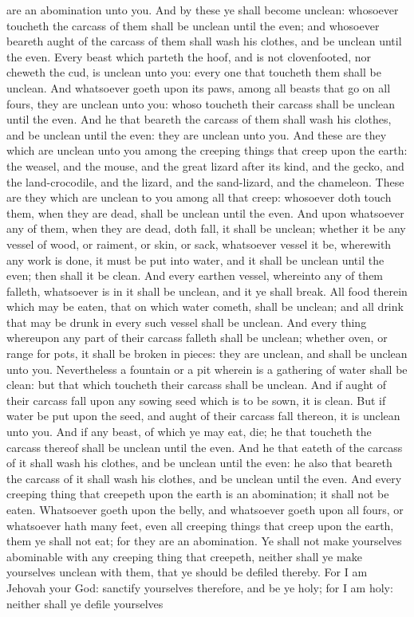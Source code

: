 are an abomination unto you.  And by these ye shall become unclean: whosoever toucheth the carcass of them shall be unclean until the even; and whosoever beareth aught of the carcass of them shall wash his clothes, and be unclean until the even. Every beast which parteth the hoof, and is not clovenfooted, nor cheweth the cud, is unclean unto you: every one that toucheth them shall be unclean. And whatsoever goeth upon its paws, among all beasts that go on all fours, they are unclean unto you: whoso toucheth their carcass shall be unclean until the even. And he that beareth the carcass of them shall wash his clothes, and be unclean until the even: they are unclean unto you.  And these are they which are unclean unto you among the creeping things that creep upon the earth: the weasel, and the mouse, and the great lizard after its kind, and the gecko, and the land-crocodile, and the lizard, and the sand-lizard, and the chameleon. These are they which are unclean to you among all that creep: whosoever doth touch them, when they are dead, shall be unclean until the even. And upon whatsoever any of them, when they are dead, doth fall, it shall be unclean; whether it be any vessel of wood, or raiment, or skin, or sack, whatsoever vessel it be, wherewith any work is done, it must be put into water, and it shall be unclean until the even; then shall it be clean. And every earthen vessel, whereinto any of them falleth, whatsoever is in it shall be unclean, and it ye shall break. All food therein which may be eaten, that on which water cometh, shall be unclean; and all drink that may be drunk in every such vessel shall be unclean. And every thing whereupon any part of their carcass falleth shall be unclean; whether oven, or range for pots, it shall be broken in pieces: they are unclean, and shall be unclean unto you. Nevertheless a fountain or a pit wherein is a gathering of water shall be clean: but that which toucheth their carcass shall be unclean. And if aught of their carcass fall upon any sowing seed which is to be sown, it is clean. But if water be put upon the seed, and aught of their carcass fall thereon, it is unclean unto you.  And if any beast, of which ye may eat, die; he that toucheth the carcass thereof shall be unclean until the even. And he that eateth of the carcass of it shall wash his clothes, and be unclean until the even: he also that beareth the carcass of it shall wash his clothes, and be unclean until the even.  And every creeping thing that creepeth upon the earth is an abomination; it shall not be eaten. Whatsoever goeth upon the belly, and whatsoever goeth upon all fours, or whatsoever hath many feet, even all creeping things that creep upon the earth, them ye shall not eat; for they are an abomination. Ye shall not make yourselves abominable with any creeping thing that creepeth, neither shall ye make yourselves unclean with them, that ye should be defiled thereby. For I am Jehovah your God: sanctify yourselves therefore, and be ye holy; for I am holy: neither shall ye defile yourselves 
